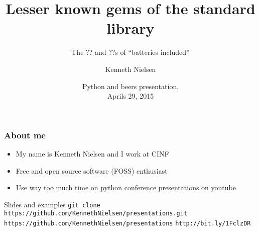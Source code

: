 \documentclass{beamer}
\title{Lesser known gems of the standard library}
\subtitle{The ?? and ??s of ``batteries included''}
\author{Kenneth Nielsen\inst{1}}
\institute
{
  \inst{1}%
  Center for Individual Nanoparticle Functionality (CINF)\\
  Institute of Physics\\
  Technical University of Denmark (DTU)
}
\date{
  Python and beers presentation,\\
  Aprils 29, 2015}
\begin{document}
\frame{\titlepage}

\begin{frame}
  \frametitle{About me}
  \begin{itemize}
    \item My name is Kenneth Nielsen and I work at CINF
    \item Free and open source software (FOSS) enthusiast
    \item Use way too much time on python conference presentations on
      youtube
  \end{itemize}
  \begin{block}{Slides and examples}
    \center
    \footnotesize
    \texttt{git clone https://github.com/KennethNielsen/presentations.git}\newline
    \newline
    \texttt{https://github.com/KennethNielsen/presentations}
    \texttt{http://bit.ly/1FclzDR}
  \end{block}
\end{frame}


\end{document}
